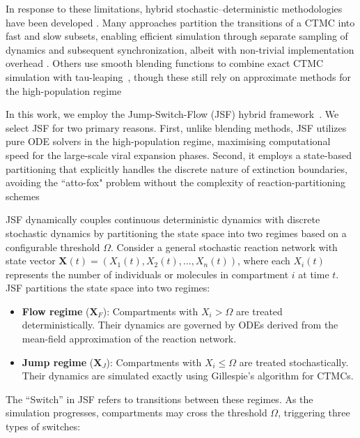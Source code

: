 \documentclass{article}
\begin{document}
In response to these limitations, hybrid stochastic–deterministic methodologies have been developed \cite{Kreger2021Hybrid, Simoni2019Hybrid, Bressloff2014Hybrid,Kynaston2023Hybrid}. Many approaches partition the transitions of a CTMC into fast and slow subsets, enabling efficient simulation through separate sampling of dynamics and subsequent synchronization, albeit with non-trivial implementation overhead \cite{Simoni2019Hybrid}. Others use smooth blending functions to combine exact CTMC simulation with tau-leaping~\cite{Trindade2024Hybrid}, though these still rely on approximate methods for the high-population regime




In this work, we employ the Jump-Switch-Flow (JSF) hybrid framework~\cite{Germano2024JSF}. We select JSF for two primary reasons. First, unlike blending methods, JSF utilizes pure ODE solvers in the high-population regime, maximising computational speed for the large-scale viral expansion phases. Second, it employs a state-based partitioning that explicitly handles the discrete nature of extinction boundaries, avoiding the ``atto-fox" problem without the complexity of reaction-partitioning schemes


JSF dynamically couples continuous deterministic dynamics with discrete stochastic dynamics by partitioning the state space into two regimes based on a configurable threshold $\Omega$. Consider a general stochastic reaction network with state vector $\mathbf{X}(t) = (X_1(t), X_2(t), \ldots, X_n(t))$, where each $X_i(t)$ represents the number of individuals or molecules in compartment $i$ at time $t$. JSF partitions the state space into two regimes:
\begin{itemize}
\item \textbf{Flow regime} ($\mathbf{X}_F$): Compartments with $X_i > \Omega$ are treated deterministically. Their dynamics are governed by ODEs derived from the mean-field approximation of the reaction network.

\item \textbf{Jump regime} ($\mathbf{X}_J$): Compartments with $X_i \leq \Omega$ are treated stochastically. Their dynamics are simulated exactly using Gillespie's algorithm for CTMCs.
\end{itemize}

The ``Switch'' in JSF refers to transitions between these regimes. As the simulation progresses, compartments may cross the threshold $\Omega$, triggering three types of switches:
\end{document}
